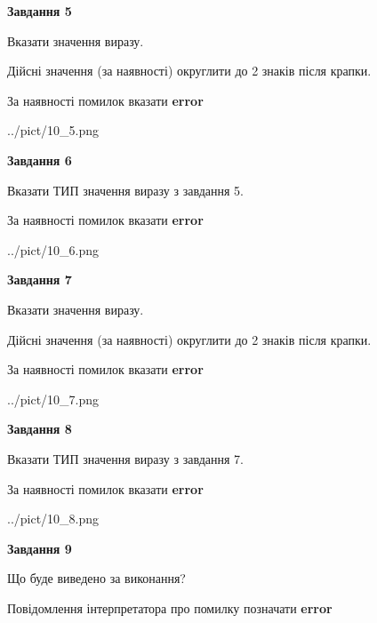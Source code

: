 \documentclass[11pt, ukrainian]{article}
\begin{document}
{\begin {large}
{\begin {center}\textbf{Завдання 5}\end {center}}\par
Вказати значення виразу. \par
Дійсні значення (за наявності) округлити до 2 знаків після крапки. \par
За наявності помилок вказати \textbf{error}

\begin{center}
	{../pict/10_5.png}
\end{center}
\newpage

{\begin {center}\textbf{Завдання 6}\end {center}}\par
Вказати ТИП значення виразу з завдання 5. \par
За наявності помилок вказати \textbf{error}

\begin{center}
	{../pict/10_6.png}
\end{center}
\newpage

{\begin {center}\textbf{Завдання 7}\end {center}}\par
Вказати значення виразу. \par
Дійсні значення (за наявності) округлити до 2 знаків після крапки. \par
За наявності помилок вказати \textbf{error}

\begin{center}
	{../pict/10_7.png}
\end{center}
\newpage

{\begin {center}\textbf{Завдання 8}\end {center}}\par
Вказати ТИП значення виразу з завдання 7. \par
За наявності помилок вказати \textbf{error}

\begin{center}
	{../pict/10_8.png}
\end{center}
\newpage

{\begin {center}\textbf{Завдання 9}\end {center}}\par
Що буде виведено за виконання? \par
Повідомлення інтерпретатора про помилку позначати \textbf{error}


\end{large}}
\end{document}

